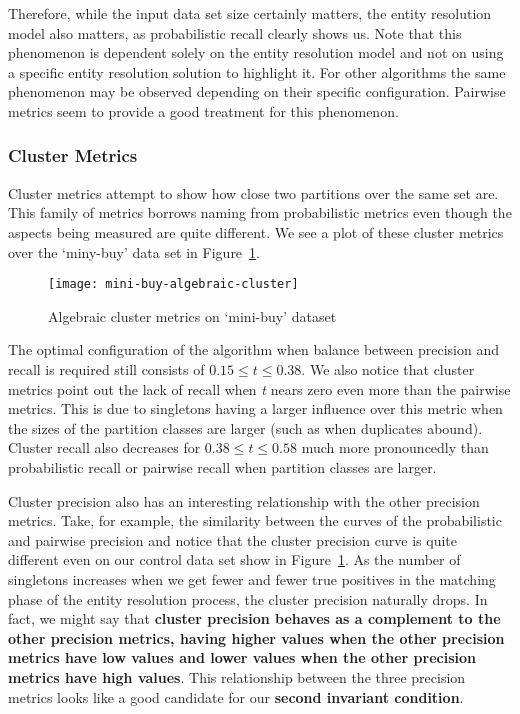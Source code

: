 Therefore, while the input data set size certainly matters, the entity
resolution model also matters, as probabilistic recall clearly shows us.
Note that this phenomenon is dependent solely on the entity resolution model and
not on using a specific entity resolution solution to highlight it.
For other algorithms the same phenomenon may be observed depending on their
specific configuration.
Pairwise metrics seem to provide a good treatment for this phenomenon.

\subsubsection{Cluster Metrics}\label{subsubsec:Cluster Results}

Cluster metrics attempt to show how close two partitions over the same set are.
This family of metrics borrows naming from probabilistic metrics even though
the aspects being measured are quite different.
We see a plot of these cluster metrics over the `miny-buy' data set in
Figure~\ref{fig:mini-alg-cluster}.

\begin{figure}[htbp]
    \centering
    \captionsetup{justification=centering}
    \texttt{[image: mini-buy-algebraic-cluster]}
    \caption{Algebraic cluster metrics on `mini-buy' dataset}\label{fig:mini-alg-cluster}
\end{figure}

The optimal configuration of the algorithm when balance between precision and
recall is required still consists of $0.15 \le t \le 0.38$.
We also notice that cluster metrics point out the lack of recall when \textit{t}
nears zero even more than the pairwise metrics.
This is due to singletons having a larger influence over this metric when the
sizes of the partition classes are larger (such as when duplicates abound).
Cluster recall also decreases for $0.38 \le t \le 0.58$ much more pronouncedly
than probabilistic recall or pairwise recall when partition classes are larger.

Cluster precision also has an interesting relationship with the other precision
metrics.
Take, for example, the similarity between the curves of the probabilistic and
pairwise precision and notice that the cluster precision curve is quite
different even on our control data set show in Figure~\ref{fig:mini-alg-cluster}.
As the number of singletons increases when we get fewer and fewer true positives
in the matching phase of the entity resolution process, the cluster precision
naturally drops.
In fact, we might say that \textbf{cluster precision behaves as a complement to the
    other precision metrics, having higher values when the other precision metrics
    have low values and lower values when the other precision metrics have high
    values}.
This relationship between the three precision metrics looks like a good
candidate for our \textbf{second invariant condition}.

